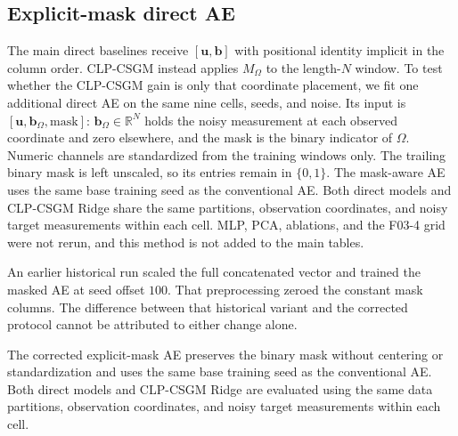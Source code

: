 \subsection{Explicit-mask direct AE}
\label{app:crosswell_explicit_mask}

The main direct baselines receive $[\boldsymbol{u},\boldsymbol{b}]$ with
positional identity implicit in the column order. CLP-CSGM instead applies
$M_{\Omega}$ to the length-$N$ window. To test whether the CLP-CSGM gain is
only that coordinate placement, we fit one additional direct AE on the same
nine cells, seeds, and noise. Its input is
$[\boldsymbol{u},\boldsymbol{b}_{\Omega},\mathrm{mask}]$:
$\boldsymbol{b}_{\Omega}\in\mathbb{R}^{N}$ holds the noisy measurement at each
observed coordinate and zero elsewhere, and the mask is the binary indicator
of $\Omega$. Numeric channels are standardized from the training windows only.
The trailing binary mask is left unscaled, so its entries remain in
$\{0,1\}$. The mask-aware AE uses the same base training seed as the
conventional AE. Both direct models and CLP-CSGM Ridge share the same
partitions, observation coordinates, and noisy target measurements within
each cell. MLP, PCA, ablations, and the F03-4 grid were not rerun, and this
method is not added to the main tables.

An earlier historical run scaled the full concatenated vector and trained
the masked AE at seed offset $100$. That preprocessing zeroed the constant
mask columns. The difference between that historical variant and the
corrected protocol cannot be attributed to either change alone.

\begin{table}[htbp]
  \centering
  \caption{Cross-well CLP-CSGM Ridge versus AE $[\boldsymbol{u},\boldsymbol{b}]$
  and an AE that also receives an explicit window mask ($n=3$ seeds).
  $\Delta$ is the other method's RMSE minus CLP RMSE. Positive $\Delta$ favors
  CLP-CSGM Ridge. Wins count seeds with strictly lower CLP RMSE.}
  \label{tab:crosswell_explicit_mask}
  \small
\end{table}

The corrected explicit-mask AE preserves the binary mask without centering or
standardization and uses the same base training seed as the conventional AE.
Both direct models and CLP-CSGM Ridge are evaluated using the same data
partitions, observation coordinates, and noisy target measurements within
each cell.

